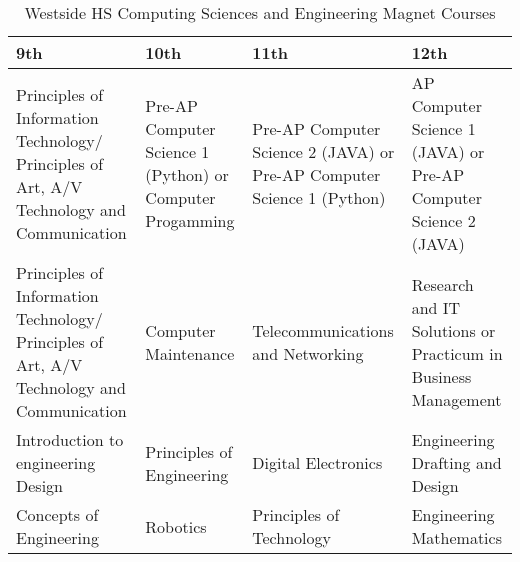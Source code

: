 \begin{table}[]
	\centering
	\footnotesize
	\caption{Westside HS Computing Sciences and Engineering Magnet Courses \cite{westside}}
	\label{westsidemag}
	\begin{tabular}{|p{3.5cm}|p{3.5cm}|p{3.5cm}|p{3.5cm}|}
		\hline
	\textbf{9th}     & \textbf{10th}        & \textbf{11th}         & \textbf{12th}               \\ \hline
Principles of Information Technology/ Principles of Art, A/V Technology and Communication & Pre-AP Computer Science 1 (Python) or Computer Progamming & Pre-AP Computer Science 2 (JAVA) or Pre-AP Computer Science 1 (Python) & AP Computer Science 1 (JAVA) or Pre-AP Computer Science 2 (JAVA) \\ \hline
Principles of Information Technology/ Principles of Art, A/V Technology and Communication & Computer Maintenance & Telecommunications and Networking & Research and IT Solutions or Practicum in Business Management    \\\hline
Introduction to engineering Design & Principles of Engineering & Digital Electronics & Engineering Drafting and Design \\\hline
Concepts of Engineering & Robotics & Principles of Technology & Engineering Mathematics \\ \hline                                    \end{tabular}
\end{table}

